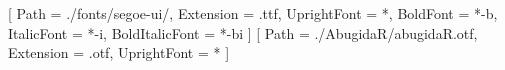 \setmainfont{segoe-ui}[
    Path = ./fonts/segoe-ui/,
    Extension = .ttf,
    UprightFont = *,
    BoldFont = *-b,
    ItalicFont = *-i,
    BoldItalicFont = *-bi
]
\newfontfamily
{}[
    Path = ./AbugidaR/abugidaR.otf,
    Extension = .otf,
    UprightFont = *
]
